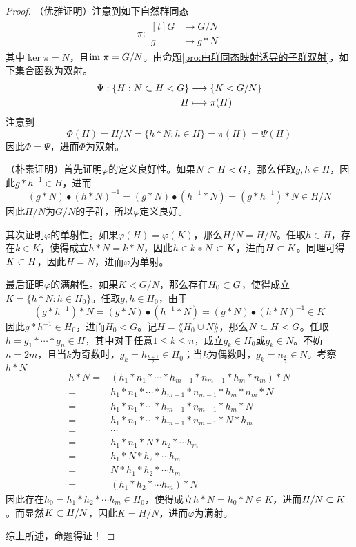 \begin{proof}
	（优雅证明）注意到如下自然群同态
	\begin{align*}
		\pi:\begin{aligned}[t]
			G&\longrightarrow G/N\\
			g&\longmapsto g*N
		\end{aligned}
	\end{align*}
	其中$\ker\pi=N$，且$\text{im } \pi=G/N$。由命题\ref{pro:由群同态映射诱导的子群双射}，如下集合函数为双射。
	\begin{align*}
		\Psi:\begin{aligned}[t]
			\{ H:N\subset H<G \}&\longrightarrow \{ K<G/N \}\\
			H&\longmapsto \pi(H)
		\end{aligned}
	\end{align*}
	注意到
	$$
	\Phi(H)=H/N=\{ h*N:h\in H \}=\pi(H)=\Psi(H)
	$$
	因此$\Phi=\Psi$，进而$\Phi$为双射。
	
	（朴素证明）首先证明$\varphi$的定义良好性。如果$N\subset H < G$，那么任取$g,h\in H$，因此$g*h^{-1}\in H$，进而
	$$
	(g*N)\bullet(h*N)^{-1}=(g*N)\bullet(h^{-1}*N)=(g*h^{-1})*N\in H/N
	$$
	因此$H/N$为$G/N$的子群，所以$\varphi$定义良好。
	
	其次证明$\varphi$的单射性。如果$\varphi(H)=\varphi(K)$，那么$H/N=H/N$。任取$h\in H$，存在$k\in K$，使得成立$h*N=k*N$，因此$h\in k*N\subset K$，进而$H\subset K$。同理可得$K\subset H$，因此$H=N$，进而$\varphi$为单射。
	
	最后证明$\varphi$的满射性。如果$K<G/N$，那么存在$H_0\subset G$，使得成立$K=\{ h*N:h\in H_0 \}$。任取$g,h\in H_0$，由于
	$$
	(g*h^{-1})*N=(g*N)\bullet(h^{-1}*N)=(g*N)\bullet(h*N)^{-1}\in K
	$$
	因此$g*h^{-1}\in H_0$，进而$H_0<G$。记$H=\lang H_0\cup N \rang$，那么$N\subset H<G$。任取$h=g_1*\cdots* g_n\in H$，其中对于任意$1\le k\le n$，成立$g_k\in H_0$或$g_k\in N$。不妨$n=2m$，且当$k$为奇数时，$g_k=h_{\frac{k+1}{2}}\in H_0$；当$k$为偶数时，$g_k=n_{\frac{k}{2}}\in N$。考察$h*N$
	\begin{align*}
		h*N=&(h_1*n_1*\cdots *h_{m-1}*n_{m-1}*h_m*n_m)*N\\
		= & h_1*n_1*\cdots *h_{m-1}*n_{m-1}*h_m*n_m*N\\
		= & h_1*n_1*\cdots *h_{m-1}*n_{m-1}*h_m*N\\
		= & h_1*n_1*\cdots *h_{m-1}*n_{m-1}*N*h_m\\
		= & \cdots\\
		= & h_1*n_1*N*h_{2}*\cdots h_{m}\\
		= & h_1*N*h_{2}*\cdots h_{m}\\
		= & N*h_1*h_{2}*\cdots h_{m}\\
		= & (h_1*h_{2}*\cdots h_{m})*N
	\end{align*}
	因此存在$h_0=h_1*h_{2}*\cdots h_{m}\in H_0$，使得成立$h*N=h_0*N\in K$，进而$H/N\subset K$。而显然$K\subset H/N$，因此$K=H/N$，进而$\varphi$为满射。
	
	综上所述，命题得证！
\end{proof}

